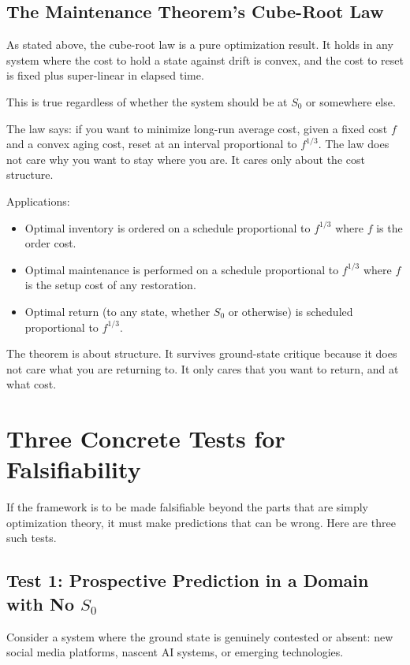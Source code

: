 \documentclass[12pt]{article}
\begin{document}
\subsection{The Maintenance Theorem's Cube-Root Law}

As stated above, the cube-root law is a pure optimization result. It holds in any system where the cost to hold a state against drift is convex, and the cost to reset is fixed plus super-linear in elapsed time.

This is true regardless of whether the system should be at $S_0$ or somewhere else.

The law says: if you want to minimize long-run average cost, given a fixed cost $f$ and a convex aging cost, reset at an interval proportional to $f^{1/3}$. The law does not care why you want to stay where you are. It cares only about the cost structure.

Applications:
\begin{itemize}
\item Optimal inventory is ordered on a schedule proportional to $f^{1/3}$ where $f$ is the order cost.
\item Optimal maintenance is performed on a schedule proportional to $f^{1/3}$ where $f$ is the setup cost of any restoration.
\item Optimal return (to any state, whether $S_0$ or otherwise) is scheduled proportional to $f^{1/3}$.
\end{itemize}

The theorem is about structure. It survives ground-state critique because it does not care what you are returning to. It only cares that you want to return, and at what cost.

\section{Three Concrete Tests for Falsifiability}

If the framework is to be made falsifiable beyond the parts that are simply optimization theory, it must make predictions that can be wrong. Here are three such tests.

\subsection{Test 1: Prospective Prediction in a Domain with No $S_0$}

Consider a system where the ground state is genuinely contested or absent: new social media platforms, nascent AI systems, or emerging technologies.
\end{document}
